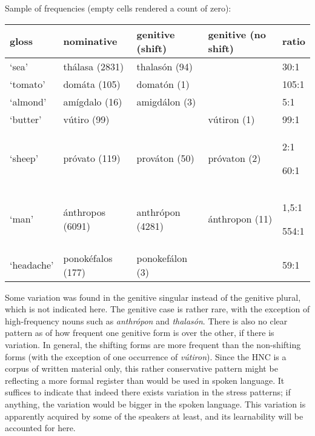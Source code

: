 \documentclass[a4paper]{article}
\begin{document}
\ea Sample of frequencies (empty cells rendered a count of zero):

\begin{center}
\tablehead{}
\begin{supertabular}{m{0.66775984in}|m{1.1143599in}|m{1.0629599in}|m{1.1920599in}|m{0.34625986in}}
 gloss &
 nominative &
 genitive (shift) &
 genitive (no shift) &
 ratio\\\hline
 ‘sea’ &
 thálasa (2831) &
 thalasón (94) &
\footnotemark{} &
 30:1\\\hline
 ‘tomato’ &
 domáta (105) &
 domatón (1) &
\footnotemark{} &
 105:1\\\hline
 ‘almond’ &
 amígdalo (16) &
 amigdálon (3) &
\footnotemark{} &
 5:1\\\hline
 ‘butter’ &
 vútiro (99) &
 \footnotemark{}  &
 vútiron (1) &
 99:1\\\hline
 ‘sheep’ &
 próvato (119) &
 prováton (50) &
 próvaton (2) &
{ 2:1}

 60:1\\\hline
 ‘man’ &
 ánthropos (6091) &
 anthrópon (4281) &
 ánthropon (11) &
{ 1,5:1}

 554:1\\\hline
 ‘headache’ &
 ponokéfalos (177) &
 ponokefálon (3) &
\footnotemark{} &
 59:1\\
\end{supertabular}
\end{center}
\addtocounter{footnote}{-5}

\footnotetext{}
\footnotetext{}
\z

Some variation was found in the genitive singular instead of the genitive plural, which is not indicated here. The genitive case is rather rare, with the exception of high-frequency nouns such as \textit{anthrópon} and \textit{thalasón}. There is also no clear pattern as of how frequent one genitive form is over the other, if there is variation. In general, the shifting forms are more frequent than the non-shifting forms (with the exception of one occurrence of \textit{vútiron}). Since the HNC is a corpus of written material only, this rather conservative pattern might be reflecting a more formal register than would be used in spoken language. It suffices to indicate that indeed there exists variation in the stress patterns; if anything, the variation would be bigger in the spoken language. This variation is apparently acquired by some of the speakers at least, and its learnability will be accounted for here.
\end{document}
